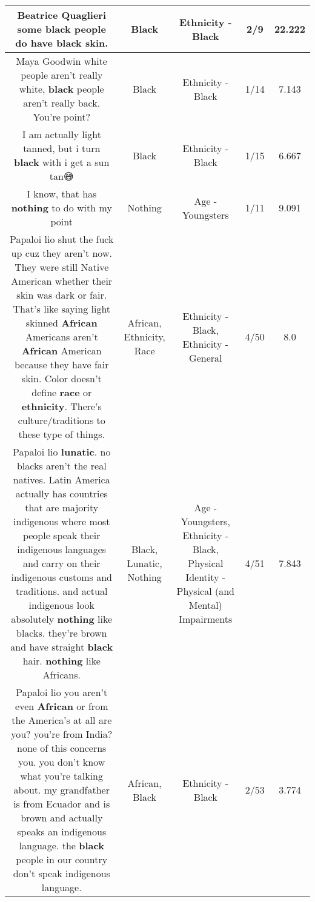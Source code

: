 \documentclass[11pt]{article}
\newlength\mylength
\begin{document}
\begin{center}
\begin{longtable}{|C{.65\mylength}|C{.30\mylength}|C{.12\mylength}|C{.12\mylength}|C{.12\mylength}|}
  \small Beatrice Quaglieri some \textbf{black} people do have \textbf{black} skin.\normalsize   & Black & Ethnicity - Black & 2/9 & 22.222 \\  \hline
  \small Maya Goodwin white people aren't really white, \textbf{black} people aren't really back. You're point?\normalsize   & Black & Ethnicity - Black & 1/14 & 7.143 \\  \hline
  \small I am actually light tanned, but i turn \textbf{black} with i get a sun tan😅\normalsize   & Black & Ethnicity - Black & 1/15 & 6.667 \\  \hline
  \small {} I know, that has \textbf{nothing} to do with my point\normalsize   & Nothing & Age - Youngsters & 1/11 & 9.091 \\  \hline
  \small Papaloi lio shut the fuck up cuz they aren't now. They were still Native American whether their skin was dark or fair. That's like saying light skinned \textbf{African} Americans aren't \textbf{African} American because they have fair skin. Color doesn't define \textbf{race} or \textbf{ethnicity}. There's culture/traditions to these type of things.\normalsize   & African, Ethnicity, Race & Ethnicity - Black, Ethnicity - General & 4/50 & 8.0 \\  \hline
  \small Papaloi lio \textbf{lunatic}. no blacks aren't the real natives. Latin America actually has countries that are majority indigenous where most people speak their indigenous languages and carry on their indigenous customs and traditions. and actual indigenous look absolutely \textbf{nothing} like blacks. they're brown and have straight \textbf{black} hair. \textbf{nothing} like Africans.\normalsize   & Black, Lunatic, Nothing & Age - Youngsters, Ethnicity - Black, Physical Identity - Physical (and Mental) Impairments & 4/51 & 7.843 \\  \hline
  \small Papaloi lio you aren't even \textbf{African} or from the America's at all are you? you're from India? none of this concerns you. you don't know what you're talking about. my grandfather is from Ecuador and is brown and actually speaks an indigenous language. the \textbf{black} people in our country don't speak indigenous language.\normalsize   & African, Black & Ethnicity - Black & 2/53 & 3.774 \\  \hline

\end{longtable}
\end{center}
\end{document}
